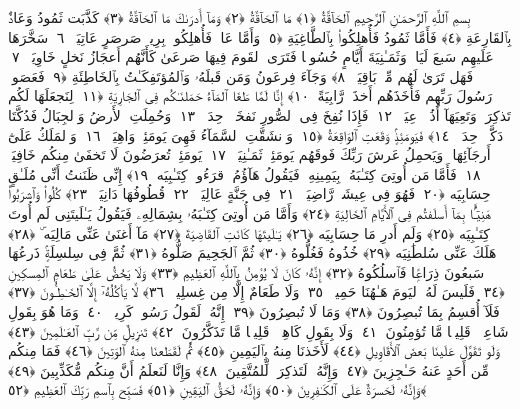 
  
    
  
    
    

\nopagebreak
  بِسمِ ٱللَّهِ ٱلرَّحمَـٰنِ ٱلرَّحِيمِ
  ٱلحَآقَّةُ ﴿١﴾
 مَا ٱلحَآقَّةُ ﴿٢﴾
 وَمَآ أَدرَىٰكَ مَا ٱلحَآقَّةُ ﴿٣﴾
 كَذَّبَت ثَمُودُ وَعَادٌۢ بِٱلقَارِعَةِ ﴿٤﴾
 فَأَمَّا ثَمُودُ فَأُهلِكُوا۟ بِٱلطَّاغِيَةِ ﴿٥﴾
 وَأَمَّا عَادٌۭ فَأُهلِكُوا۟ بِرِيحٍۢ صَرصَرٍ عَاتِيَةٍۢ ﴿٦﴾
 سَخَّرَهَا عَلَيهِم سَبعَ لَيَالٍۢ وَثَمَـٰنِيَةَ أَيَّامٍ حُسُومًۭا فَتَرَى ٱلقَومَ فِيهَا صَرعَىٰ كَأَنَّهُم أَعجَازُ نَخلٍ خَاوِيَةٍۢ ﴿٧﴾
 فَهَل تَرَىٰ لَهُم مِّنۢ بَاقِيَةٍۢ ﴿٨﴾
 وَجَآءَ فِرعَونُ وَمَن قَبلَهُۥ وَٱلمُؤتَفِكَـٰتُ بِٱلخَاطِئَةِ ﴿٩﴾
 فَعَصَوا۟ رَسُولَ رَبِّهِم فَأَخَذَهُم أَخذَةًۭ رَّابِيَةً ﴿١٠﴾
 إِنَّا لَمَّا طَغَا ٱلمَآءُ حَمَلنَـٰكُم فِى ٱلجَارِيَةِ ﴿١١﴾
 لِنَجعَلَهَا لَكُم تَذكِرَةًۭ وَتَعِيَهَآ أُذُنٌۭ وَٟعِيَةٌۭ ﴿١٢﴾
 فَإِذَا نُفِخَ فِى ٱلصُّورِ نَفخَةٌۭ وَٟحِدَةٌۭ ﴿١٣﴾
 وَحُمِلَتِ ٱلأَرضُ وَٱلجِبَالُ فَدُكَّتَا دَكَّةًۭ وَٟحِدَةًۭ ﴿١٤﴾
 فَيَومَئِذٍۢ وَقَعَتِ ٱلوَاقِعَةُ ﴿١٥﴾
 وَٱنشَقَّتِ ٱلسَّمَآءُ فَهِىَ يَومَئِذٍۢ وَاهِيَةٌۭ ﴿١٦﴾
 وَٱلمَلَكُ عَلَىٰٓ أَرجَآئِهَا ۚ وَيَحمِلُ عَرشَ رَبِّكَ فَوقَهُم يَومَئِذٍۢ ثَمَـٰنِيَةٌۭ ﴿١٧﴾
 يَومَئِذٍۢ تُعرَضُونَ لَا تَخفَىٰ مِنكُم خَافِيَةٌۭ ﴿١٨﴾
 فَأَمَّا مَن أُوتِىَ كِتَـٰبَهُۥ بِيَمِينِهِۦ فَيَقُولُ هَآؤُمُ ٱقرَءُوا۟ كِتَـٰبِيَه ﴿١٩﴾
 إِنِّى ظَنَنتُ أَنِّى مُلَـٰقٍ حِسَابِيَه ﴿٢٠﴾
 فَهُوَ فِى عِيشَةٍۢ رَّاضِيَةٍۢ ﴿٢١﴾
 فِى جَنَّةٍ عَالِيَةٍۢ ﴿٢٢﴾
 قُطُوفُهَا دَانِيَةٌۭ ﴿٢٣﴾
 كُلُوا۟ وَٱشرَبُوا۟ هَنِيٓـًٔۢا بِمَآ أَسلَفتُم فِى ٱلأَيَّامِ ٱلخَالِيَةِ ﴿٢٤﴾
 وَأَمَّا مَن أُوتِىَ كِتَـٰبَهُۥ بِشِمَالِهِۦ فَيَقُولُ يَـٰلَيتَنِى لَم أُوتَ كِتَـٰبِيَه ﴿٢٥﴾
 وَلَم أَدرِ مَا حِسَابِيَه ﴿٢٦﴾
 يَـٰلَيتَهَا كَانَتِ ٱلقَاضِيَةَ ﴿٢٧﴾
 مَآ أَغنَىٰ عَنِّى مَالِيَه ۜ ﴿٢٨﴾
 هَلَكَ عَنِّى سُلطَٰنِيَه ﴿٢٩﴾
 خُذُوهُ فَغُلُّوهُ ﴿٣٠﴾
 ثُمَّ ٱلجَحِيمَ صَلُّوهُ ﴿٣١﴾
 ثُمَّ فِى سِلسِلَةٍۢ ذَرعُهَا سَبعُونَ ذِرَاعًۭا فَٱسلُكُوهُ ﴿٣٢﴾
 إِنَّهُۥ كَانَ لَا يُؤمِنُ بِٱللَّهِ ٱلعَظِيمِ ﴿٣٣﴾
 وَلَا يَحُضُّ عَلَىٰ طَعَامِ ٱلمِسكِينِ ﴿٣٤﴾
 فَلَيسَ لَهُ ٱليَومَ هَـٰهُنَا حَمِيمٌۭ ﴿٣٥﴾
 وَلَا طَعَامٌ إِلَّا مِن غِسلِينٍۢ ﴿٣٦﴾
 لَّا يَأكُلُهُۥٓ إِلَّا ٱلخَـٰطِـُٔونَ ﴿٣٧﴾
 فَلَآ أُقسِمُ بِمَا تُبصِرُونَ ﴿٣٨﴾
 وَمَا لَا تُبصِرُونَ ﴿٣٩﴾
 إِنَّهُۥ لَقَولُ رَسُولٍۢ كَرِيمٍۢ ﴿٤٠﴾
 وَمَا هُوَ بِقَولِ شَاعِرٍۢ ۚ قَلِيلًۭا مَّا تُؤمِنُونَ ﴿٤١﴾
 وَلَا بِقَولِ كَاهِنٍۢ ۚ قَلِيلًۭا مَّا تَذَكَّرُونَ ﴿٤٢﴾
 تَنزِيلٌۭ مِّن رَّبِّ ٱلعَـٰلَمِينَ ﴿٤٣﴾
 وَلَو تَقَوَّلَ عَلَينَا بَعضَ ٱلأَقَاوِيلِ ﴿٤٤﴾
 لَأَخَذنَا مِنهُ بِٱليَمِينِ ﴿٤٥﴾
 ثُمَّ لَقَطَعنَا مِنهُ ٱلوَتِينَ ﴿٤٦﴾
 فَمَا مِنكُم مِّن أَحَدٍ عَنهُ حَـٰجِزِينَ ﴿٤٧﴾
 وَإِنَّهُۥ لَتَذكِرَةٌۭ لِّلمُتَّقِينَ ﴿٤٨﴾
 وَإِنَّا لَنَعلَمُ أَنَّ مِنكُم مُّكَذِّبِينَ ﴿٤٩﴾
 وَإِنَّهُۥ لَحَسرَةٌ عَلَى ٱلكَـٰفِرِينَ ﴿٥٠﴾
 وَإِنَّهُۥ لَحَقُّ ٱليَقِينِ ﴿٥١﴾
 فَسَبِّح بِٱسمِ رَبِّكَ ٱلعَظِيمِ ﴿٥٢﴾
 
